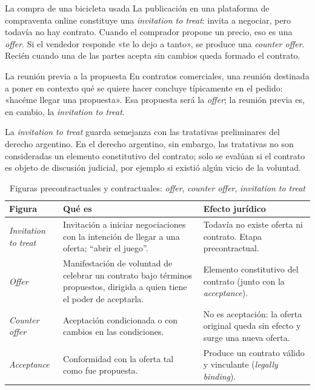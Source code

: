 \documentclass[12pt,oneside]{book}
\begin{document}
\begin{example}{La compra de una bicicleta usada}
La publicación en una plataforma de compraventa online constituye una \textit{invitation to treat}: invita a negociar, pero todavía no hay contrato. Cuando el comprador propone un precio, eso es una \textit{offer}. Si el vendedor responde «te lo dejo a tanto», se produce una \textit{counter offer}. Recién cuando una de las partes acepta sin cambios queda formado el contrato.
\end{example}

\begin{example}{La reunión previa a la propuesta}
En contratos comerciales, una reunión destinada a poner en contexto qué se quiere hacer concluye típicamente en el pedido: «hacéme llegar una propuesta». Esa propuesta será la \textit{offer}; la reunión previa es, en cambio, la \textit{invitation to treat}.
\end{example}

La \textit{invitation to treat} guarda semejanza con las tratativas preliminares del derecho argentino. En el derecho argentino, sin embargo, las tratativas no son consideradas un elemento constitutivo del contrato; solo se evalúan si el contrato es objeto de discusión judicial, por ejemplo si existió algún vicio de la voluntad.

\begin{table}[H]
\centering
\caption{Figuras precontractuales y contractuales: \textit{offer}, \textit{counter offer}, \textit{invitation to treat}}
\begin{tabularx}{\textwidth}{>{\raggedright\arraybackslash}p{} >{\raggedright\arraybackslash}X >{\raggedright\arraybackslash}X}
\toprule
\textbf{Figura} & \textbf{Qué es} & \textbf{Efecto jurídico} \\
\midrule
\textit{Invitation to treat} & Invitación a iniciar negociaciones con la intención de llegar a una oferta; ``abrir el juego''. & Todavía no existe oferta ni contrato. Etapa precontractual. \\
\textit{Offer} & Manifestación de voluntad de celebrar un contrato bajo términos propuestos, dirigida a quien tiene el poder de aceptarla. & Elemento constitutivo del contrato (junto con la \textit{acceptance}). \\
\textit{Counter offer} & Aceptación condicionada o con cambios en las condiciones. & No es aceptación: la oferta original queda sin efecto y surge una nueva oferta. \\
\textit{Acceptance} & Conformidad con la oferta tal como fue propuesta. & Produce un contrato válido y vinculante (\textit{legally binding}). \\
\bottomrule
\end{tabularx}
\end{table}
\end{document}
